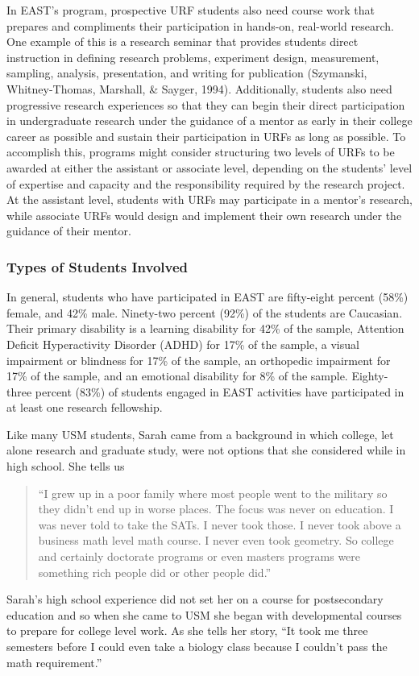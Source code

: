 \documentclass[11.5pt]{sig-alternate} %
\begin{document}
\begin{large}
In EAST's program, prospective URF students also need course work that prepares and compliments their participation in hands-on, real-world research. One example of this is a research seminar that provides students direct instruction in defining research problems, experiment design, measurement, sampling, analysis, presentation, and writing for publication (Szymanski, Whitney-Thomas, Marshall, \& Sayger, 1994). Additionally, students also need progressive research experiences so that they can begin their direct participation in undergraduate research under the guidance of a mentor as early in their college career as possible and sustain their participation in URFs as long as possible. To accomplish this, programs might consider structuring two levels of URFs to be awarded at either the assistant or associate level, depending on the students' level of expertise and capacity and the responsibility required by the research project. At the assistant level, students with URFs may participate in a mentor's research, while associate URFs would design and implement their own research under the guidance of their mentor.

\subsubsection*{Types of Students Involved}
In general, students who have participated in EAST are fifty-eight percent (58\%) female, and 42\% male. Ninety-two percent (92\%) of the students are Caucasian. Their primary disability is a learning disability for 42\% of the sample, Attention Deficit Hyperactivity Disorder (ADHD) for 17\% of the sample, a visual impairment or blindness for 17\% of the sample, an orthopedic impairment for 17\% of the sample, and an emotional disability for 8\% of the sample. Eighty-three percent (83\%) of students engaged in EAST activities have participated in at least one research fellowship.

Like many USM students, Sarah came from a background in which college, let alone research and graduate study, were not options that she considered while in high school. She tells us
\begin{quote}
    “I grew up in a poor family where most people went to the military so they didn't end up in worse places. The focus was never on education. I was never told to take the SATs. I never took those. I never took above a business math level math course. I never even took geometry. So college and certainly doctorate programs or even masters programs were something rich people did or other people did.”
\end{quote}
Sarah's high school experience did not set her on a course for postsecondary education and so when she came to USM she began with developmental courses to prepare for college level work. As she tells her story, “It took me three semesters before I could even take a biology class because I couldn't pass the math requirement.”


\end{large}
\end{document}
